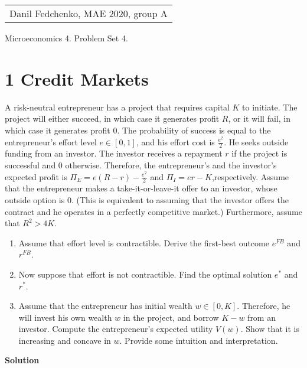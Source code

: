 \documentclass[a4paper]{article}
\begin{document}
	\begin{flushright}
	\begin{tabular}{r}
		Danil Fedchenko, MAE 2020, group A \\
	\end{tabular}
\end{flushright}


\begin{center}
	Microeconomics 4. Problem Set 4.
\end{center}
\section*{1 Credit Markets}
	A risk-neutral entrepreneur has a project that requires capital $K$ to initiate. The project
	will either succeed, in which case it generates profit $R$, or it will fail, in which case
	it generates profit $0$. The probability of success is equal to the entrepreneur's effort
	level $e \in [0, 1]$, and his effort cost is $\frac{e^2}{2}$. He seeks outside funding from an investor. The
	investor receives a repayment $r$ if the project is successful and $0$ otherwise. Therefore, the
	entrepreneur's and the investor's expected profit is $\Pi _E = e(R-r) - \frac{e^2}{2}$ and $\Pi _I = er-K$,respectively. Assume that the entrepreneur makes a take-it-or-leave-it offer to an investor,
	whose outside option is $0$. (This is equivalent to assuming that the investor offers the
	contract and he operates in a perfectly competitive market.) Furthermore, assume that $R^2 > 4K$.
	\begin{enumerate}
	\item Assume that effort level is contractible. Derive the first-best outcome $e^{FB}$ and $r^{FB}$.
	\item  Now suppose that effort is not contractible. Find the optimal solution $e^*$ and $r^*$.
	\item  Assume that the entrepreneur has initial wealth $w \in [0, K]$. Therefore, he will invest
	his own wealth $w$ in the project, and borrow $K-w$ from an investor. Compute the entrepreneur's expected utility $V(w)$. Show that it is increasing and concave in $w$. Provide some intuition and interpretation.
	\end{enumerate}

\textbf{Solution}
\end{document}
